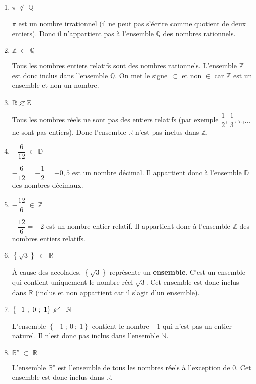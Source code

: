 \begin{corrige}
     \begin{enumerate}[label=\alph*.]
          \item %
          $\pi \; \notin \;  \mathbb{Q}$
          \par
          $\pi$ est un nombre irrationnel (il ne peut pas s'écrire comme quotient de deux entiers). Donc il n'appartient pas à l'ensemble $\mathbb{Q}$ des nombres rationnels.
          \item %
          $\mathbb{Z} \; \subset \;  \mathbb{Q}$
          \par
          Tous les nombres entiers relatifs sont des nombres rationnels. L'ensemble $\mathbb{Z}$ est donc inclus dans l'ensemble $\mathbb{Q}$. On met le signe $\subset$ et non $\in$ car $\mathbb{Z}$ est un ensemble et non un nombre.
          \item %
          $ \mathbb{R} \; \cancel{\subset} \;  \mathbb{Z}$
          \par
          Tous les nombres réels ne sont pas des entiers relatifs (par exemple $\dfrac{1}{2}$, $\dfrac{1}{3}$, $\pi$,$ \ldots$ ne sont pas entiers). Donc l'ensemble $\mathbb{R}$ n'est pas inclus dans $\mathbb{Z}$.
          \item %
          $ -\dfrac{6}{12} \; \in \;  \mathbb{D}$
          \par
          $ - \dfrac{6}{12}=-\dfrac{1}{2}=-0,5$ est un nombre décimal. Il appartient donc à l'ensemble $\mathbb{D}$ des nombres décimaux.
          \item %
          $ - \dfrac{12}{6} \; \in \;  \mathbb{Z}$
          \par
          $ - \dfrac{12}{6}=-2$ est un nombre entier relatif. Il appartient donc à l'ensemble $\mathbb{Z}$ des nombres entiers relatifs.
          \item %
          $ \left\{\sqrt{3}\right\} \; \subset \;  \mathbb{R}$
          \par
          À cause des accolades, $\left\{\sqrt{3}\right\}$ représente un \textbf{ensemble}. C'est un ensemble qui contient uniquement le nombre réel $\sqrt{3}$. Cet ensemble est donc inclus dans $\mathbb{R}$ (\og inclus \fg{} et non \og appartient \fg{} car il s'agit d'un ensemble).
          \item %
          $ \left\{-1~;~0~;~1\right\} \; \cancel{\subset} \quad \mathbb{N}$
          \par
          L'ensemble $\left\{-1~;~0~;~1\right\} $ contient le nombre $-1$ qui n'est pas un entier naturel. Il n'est donc pas inclus dans l'ensemble $\mathbb{N}.$
          \item %
          $\mathbb{R}^\star \; \subset \;  \mathbb{R}$
          \par
          L'ensemble $\mathbb{R}^\star$ est l'ensemble de tous les nombres réels à l'exception de 0. Cet ensemble est donc inclus dans  $\mathbb{R}.$
     \end{enumerate}
\end{corrige}

